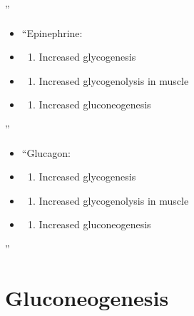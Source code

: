 \documentclass[
]{book}
\providecommand{\tightlist}{%
  \setlength{\itemsep}{0pt}\setlength{\parskip}{0pt}}
\begin{document}
''

\begin{itemize}
\item
  ``Epinephrine:
\item
  \begin{enumerate}
  \def\labelenumi{(\Alph{enumi})}
  \tightlist
  \item
    Increased glycogenesis\\
  \end{enumerate}
\item
  \begin{enumerate}
  \def\labelenumi{(\Alph{enumi})}
  \setcounter{enumi}{1}
  \tightlist
  \item
    Increased glycogenolysis in muscle\\
  \end{enumerate}
\item
  \begin{enumerate}
  \def\labelenumi{(\Alph{enumi})}
  \setcounter{enumi}{2}
  \tightlist
  \item
    Increased gluconeogenesis
  \end{enumerate}
\end{itemize}

''

\begin{itemize}
\item
  ``Glucagon:
\item
  \begin{enumerate}
  \def\labelenumi{(\Alph{enumi})}
  \tightlist
  \item
    Increased glycogenesis\\
  \end{enumerate}
\item
  \begin{enumerate}
  \def\labelenumi{(\Alph{enumi})}
  \setcounter{enumi}{1}
  \tightlist
  \item
    Increased glycogenolysis in muscle\\
  \end{enumerate}
\item
  \begin{enumerate}
  \def\labelenumi{(\Alph{enumi})}
  \setcounter{enumi}{2}
  \tightlist
  \item
    Increased gluconeogenesis
  \end{enumerate}
\end{itemize}

''

\chapter{Gluconeogenesis}\label{gluconeogenesis}
\end{document}
